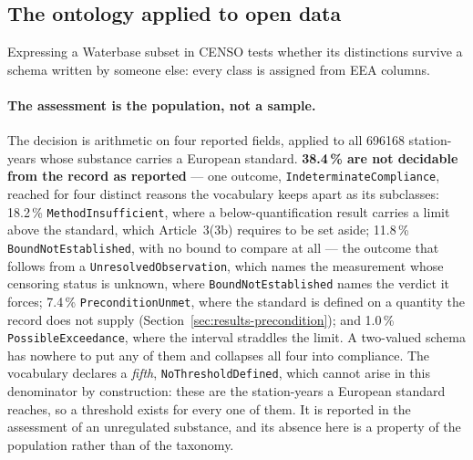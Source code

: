 \subsection{The ontology applied to open data}
\label{sec:results-wbabox}
Expressing a Waterbase subset in CENSO
tests whether its distinctions survive a schema written by someone else: every
class is assigned from EEA columns.

\paragraph{The assessment is the population, not a sample.}
The decision is arithmetic on four reported fields, applied to all
\num{696168} station-years whose substance carries a European
standard. \textbf{\num{38.4}\,\% are not
decidable from the record as reported} --- one outcome,
\texttt{IndeterminateCompliance}, reached for four distinct reasons the
vocabulary keeps apart as its subclasses: \num{18.2}\,\%
\texttt{MethodInsufficient}, where a below-quantification result
carries a limit above the standard, which Article~3(3b) requires to be set
aside; \num{11.8}\,\% \texttt{BoundNotEstablished}, with no bound to compare at
all --- the outcome that follows from a \texttt{UnresolvedObservation}, which
names the measurement whose censoring status is unknown, where
\texttt{BoundNotEstablished} names the verdict it forces; \num{7.4}\,\%
\texttt{PreconditionUnmet}, where the standard is defined on a quantity the
record does not supply (Section~\ref{sec:results-precondition}); and
\num{1.0}\,\% \texttt{PossibleExceedance}, where the interval straddles the
limit. A two-valued schema has nowhere to put any of them and collapses all four
into compliance. The vocabulary declares a \emph{fifth},
\texttt{NoThresholdDefined}, which cannot arise in this denominator by
construction: these are the station-years a European standard reaches, so a
threshold exists for every one of them. It is reported in the assessment of an
unregulated substance, and its absence here is a property of the population
rather than of the taxonomy.

